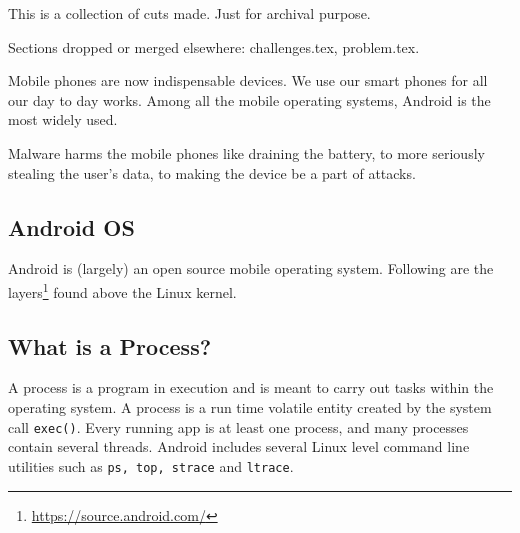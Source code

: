 
This is a collection of cuts made.  Just for archival purpose.

Sections dropped or merged elsewhere: challenges.tex, problem.tex.


Mobile phones are now indispensable devices. We use our smart phones
for all our day to day works. Among all the mobile operating systems,
Android is the most widely used.


\nocite{burguera2011crowdroid}
\nocite{gehani2012spade}
\nocite{Nikhil2015}
\nocite{elenkov2014android}
\nocite{isohara2011kernel}
\nocite{Mateti}
\nocite{kwong2012droidscope}
\nocite{lin2013identifying}
\nocite{linuxkernelarchives}
\nocite{connectivitymanager}
\nocite{linuxprocesses}
\nocite{SystemCalls}
\nocite{straceinandroid}
\nocite{dropboxcloud}
\nocite{wifimanager}
\nocite{yoon2012appscope}
\nocite{armando2014mobile}
\nocite{connectivitymanager}
\nocite{wifimanager}
\nocite{dropboxcloud}

  Malware harms the mobile phones like draining the battery,
to more seriously stealing the user's data, to making the device be a
part of attacks.

\subsection{Android OS}

Android is (largely) an open source mobile operating system.
Following are the layers\footnote{\url{https://source.android.com/}}
found above the Linux kernel.

\subsection{What is a Process?}

A process is a program in execution and is meant to carry out tasks
within the operating system.  A process is a run time volatile entity
created by the system call {\tt exec()}.  Every running app is at
least one process, and many processes contain several threads.
Android includes several Linux level command line utilities such as
{\tt ps, top, strace} and {\tt ltrace}.

